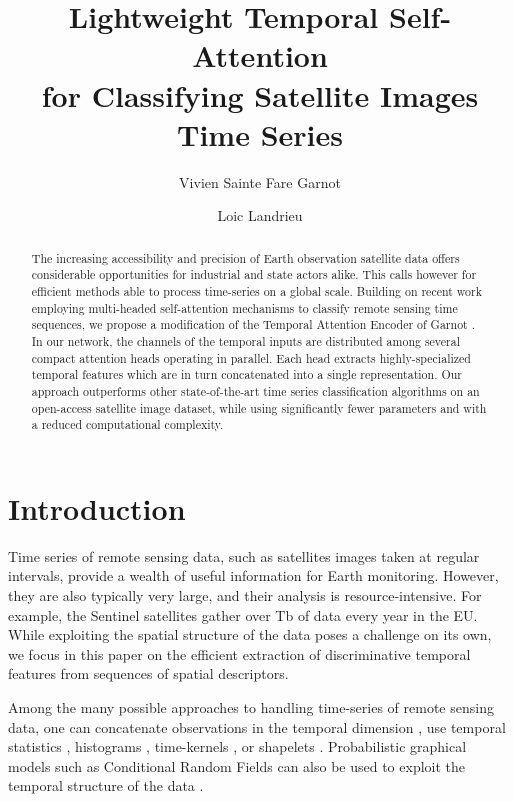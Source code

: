 \documentclass[runningheads]{llncs}
\begin{document}
\title{Lightweight Temporal Self-Attention  \\ for Classifying Satellite Images Time Series}
\author{Vivien Sainte Fare Garnot \and
Loic Landrieu
}
\maketitle              \begin{abstract}
The increasing accessibility and precision of Earth observation satellite data offers considerable opportunities for industrial and state actors alike. This calls however for efficient methods able to process time-series on a global scale.
Building on recent work employing multi-headed self-attention mechanisms to classify remote sensing time sequences, we propose a modification of the Temporal Attention Encoder of Garnot \etal \cite{garnot2019satellite}.
In our network, the channels of the temporal inputs are distributed among several compact attention heads operating in parallel. Each head extracts highly-specialized temporal features which are in turn concatenated into a single representation.
Our approach outperforms other state-of-the-art time series classification algorithms on an open-access satellite image dataset, while using significantly fewer parameters and with a reduced computational complexity.
\end{abstract}
\section{Introduction}
Time series of remote sensing data, such as satellites images taken at regular intervals, provide a wealth of useful information for Earth monitoring. However, they are also typically very large, and their analysis is resource-intensive. For example, the Sentinel satellites gather over  Tb of data every year in the EU. While exploiting the spatial structure of the data poses a challenge on its own, we focus in this paper on the efficient extraction of discriminative temporal features from sequences of spatial descriptors.

Among the many possible approaches to handling time-series of remote sensing data, one can concatenate observations in the temporal dimension \cite{kussul2016parcel}, use temporal statistics \cite{pelletier2016assessing}, histograms \cite{bailly2015dense}, time-kernels \cite{tavenard2017efficient}, or shapelets \cite{ye2009time}. Probabilistic graphical models such as Conditional Random Fields can also be used to exploit the temporal structure of the data \cite{bailly2018crop}.
\end{document}
